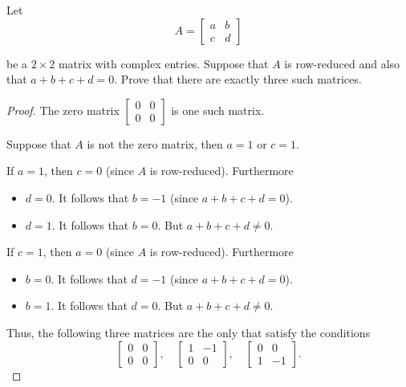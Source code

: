 \begin{exercise}
    Let
    \[
        A =
        \begin{bmatrix}
            a & b \\
            c & d
        \end{bmatrix}
    \]

    be a $2\times 2$ matrix with complex entries. Suppose that $A$ is row-reduced and also that $a + b + c + d = 0$. Prove that there are exactly three such matrices.
\end{exercise}

\begin{proof}
    The zero matrix $\begin{bmatrix}0 & 0 \\ 0 & 0\end{bmatrix}$ is one such matrix.

    Suppose that $A$ is not the zero matrix, then $a = 1$ or $c = 1$.

    If $a = 1$, then $c = 0$ (since $A$ is row-reduced). Furthermore
    \begin{itemize}
        \item $d = 0$. It follows that $b = -1$ (since $a + b + c + d = 0$).
        \item $d = 1$. It follows that $b = 0$. But $a + b + c + d\ne 0$.
    \end{itemize}

    If $c = 1$, then $a = 0$ (since $A$ is row-reduced). Furthermore
    \begin{itemize}
        \item $b = 0$. It follows that $d = -1$ (since $a + b + c + d = 0$).
        \item $b = 1$. It follows that $d = 0$. But $a + b + c + d\ne 0$.
    \end{itemize}

    Thus, the following three matrices are the only that satisfy the conditions
    \[
        \begin{bmatrix}
            0 & 0 \\
            0 & 0
        \end{bmatrix},\quad
        \begin{bmatrix}
            1 & -1 \\
            0 & 0
        \end{bmatrix},\quad
        \begin{bmatrix}
            0 & 0  \\
            1 & -1
        \end{bmatrix}.
    \]
\end{proof}

